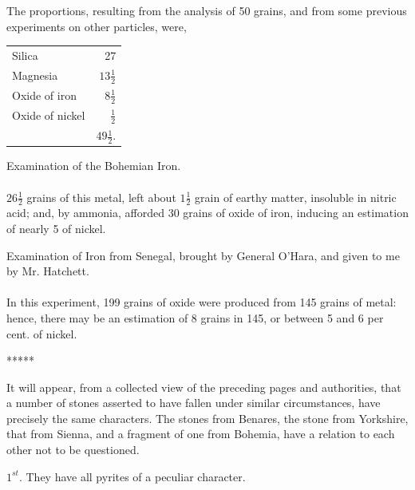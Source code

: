 \documentclass[a4paper, 12pt, oneside, twocolumn]{article}
\begin{document}
The proportions, resulting from the analysis of 50 grains, and from some previous experiments on other particles, were,
\begin{table}[H]
    \centering\bfseries
    \begin{tabular}{l r}
        Silica & 27 \\
        Magnesia & $13\frac{1}{2}$ \\ 
        Oxide of iron & $8\frac{1}{2}$ \\
        Oxide of nickel & $\frac{1}{2}$ \\ \hline
        ~ & $49\frac{1}{2}$. \\
    \end{tabular}
\end{table}
\begin{center}
Examination of the Bohemian Iron.
\end{center}
\paragraph{}
$26\frac{1}{2}$ grains of this metal, left about $1\frac{1}{2}$ grain of earthy matter, insoluble in nitric acid; and, by ammonia, afforded 30 grains of oxide of iron, inducing an estimation of nearly 5 of nickel.
\begin{center}
Examination of Iron from Senegal, brought by General O'Hara, and given to me by Mr. Hatchett.
\end{center}
\paragraph{}
In this experiment, 199 grains of oxide were produced from 145 grains of metal: hence, there may be an estimation of 8 grains in 145, or between 5 and 6 per cent. of nickel.

\centerline{*\hspace{15mm}*\hspace{15mm}*\hspace{15mm}*\hspace{15mm}*}
\bigskip

It will appear, from a collected view of the preceding pages and authorities, that a number of stones asserted to have fallen under similar circumstances, have precisely the same characters. The stones from Benares, the stone from Yorkshire, that from Sienna, and a fragment of one from Bohemia, have a relation to each other not to be questioned.

$1^{st}$. They have all pyrites of a peculiar character.
\end{document}
